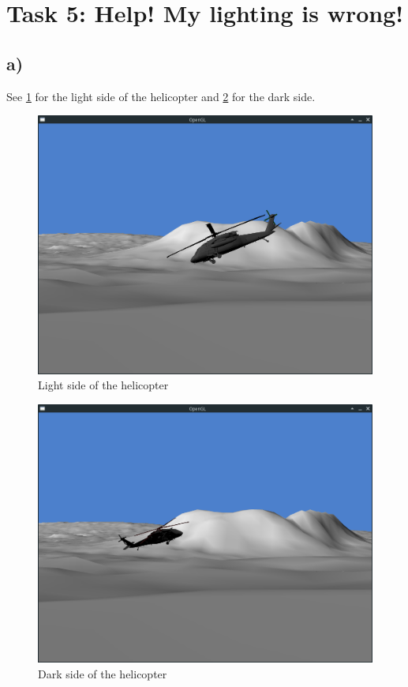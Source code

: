 \section{Task 5: Help! My lighting is wrong!}
\subsection{a)}
See \cref{fig:task5a_light} for the light side of the helicopter and \cref{fig:task5a_dark} for the dark side. 

\begin{figure}[tp]
	\centering
	\includegraphics[width=1.00\textwidth]{figures/task5a_light}
	\caption{Light side of the helicopter}
\label{fig:task5a_light}
\end{figure}

\begin{figure}[tp]
	\centering
	\includegraphics[width=1.00\textwidth]{figures/task5a_dark}
	\caption{Dark side of the helicopter}
\label{fig:task5a_dark}
\end{figure}
